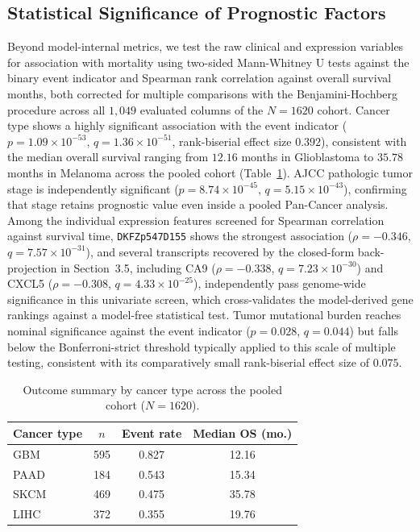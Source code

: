 \documentclass[10pt,a4paper]{article}
\begin{document}
\subsection{Statistical Significance of Prognostic Factors}
Beyond model-internal metrics, we test the raw clinical and expression variables for association with mortality using two-sided Mann-Whitney U tests against the binary event indicator and Spearman rank correlation against overall survival months, both corrected for multiple comparisons with the Benjamini-Hochberg procedure across all $1{,}049$ evaluated columns of the $N = 1620$ cohort. Cancer type shows a highly significant association with the event indicator ($p = 1.09 \times 10^{-53}$, $q = 1.36 \times 10^{-51}$, rank-biserial effect size $0.392$), consistent with the median overall survival ranging from $12.16$ months in Glioblastoma to $35.78$ months in Melanoma across the pooled cohort (Table~\ref{tab:cancer_outcomes}). AJCC pathologic tumor stage is independently significant ($p = 8.74 \times 10^{-45}$, $q = 5.15 \times 10^{-43}$), confirming that stage retains prognostic value even inside a pooled Pan-Cancer analysis. Among the individual expression features screened for Spearman correlation against survival time, \texttt{DKFZp547D155} shows the strongest association ($\rho = -0.346$, $q = 7.57 \times 10^{-31}$), and several transcripts recovered by the closed-form back-projection in Section~3.5, including CA9 ($\rho = -0.338$, $q = 7.23 \times 10^{-30}$) and CXCL5 ($\rho = -0.308$, $q = 4.33 \times 10^{-25}$), independently pass genome-wide significance in this univariate screen, which cross-validates the model-derived gene rankings against a model-free statistical test. Tumor mutational burden reaches nominal significance against the event indicator ($p = 0.028$, $q = 0.044$) but falls below the Bonferroni-strict threshold typically applied to this scale of multiple testing, consistent with its comparatively small rank-biserial effect size of $0.075$.

\begin{table}[!htbp]
\centering
\caption{Outcome summary by cancer type across the pooled cohort ($N=1620$).}
  \label{tab:cancer_outcomes}
  \begin{tabular}{lccc}
    \toprule
    Cancer type & $n$ & Event rate & Median OS (mo.) \\
    \midrule
    GBM  & 595 & 0.827 & 12.16 \\
    PAAD & 184 & 0.543 & 15.34 \\
    SKCM & 469 & 0.475 & 35.78 \\
    LIHC & 372 & 0.355 & 19.76 \\
  \bottomrule
\end{tabular}
\end{table}
\end{document}
